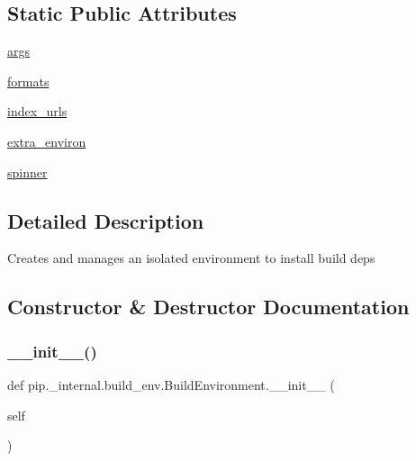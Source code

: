 \subsection*{Static Public Attributes}
\begin{DoxyCompactItemize}
\item 
\hyperlink{classpip_1_1__internal_1_1build__env_1_1BuildEnvironment_a30edcfed0338e8e520492e8b0aea6de8}{args}
\item 
\hyperlink{classpip_1_1__internal_1_1build__env_1_1BuildEnvironment_a041db50ec7e1d543e36f7b6e1cd0af28}{formats}
\item 
\hyperlink{classpip_1_1__internal_1_1build__env_1_1BuildEnvironment_aeb9cc3dee7e218d8e4bca80d17be497a}{index\+\_\+urls}
\item 
\hyperlink{classpip_1_1__internal_1_1build__env_1_1BuildEnvironment_ad3e26ab9720e3f1141cfad7551614266}{extra\+\_\+environ}
\item 
\hyperlink{classpip_1_1__internal_1_1build__env_1_1BuildEnvironment_a82ab7558a33ebc9a9957695ce35e0850}{spinner}
\end{DoxyCompactItemize}


\subsection{Detailed Description}
\begin{DoxyVerb}Creates and manages an isolated environment to install build deps
\end{DoxyVerb}
 

\subsection{Constructor \& Destructor Documentation}
\mbox{\label{classpip_1_1__internal_1_1build__env_1_1BuildEnvironment_a66d182403333531d9929e26a1b0878bd}} 
\subsubsection{\texorpdfstring{\+\_\+\+\_\+init\+\_\+\+\_\+()}{\_\_init\_\_()}}
{\footnotesize\ttfamily def pip.\+\_\+internal.\+build\+\_\+env.\+Build\+Environment.\+\_\+\+\_\+init\+\_\+\+\_\+ (\begin{DoxyParamCaption}\item[{}]{self }\end{DoxyParamCaption})}



